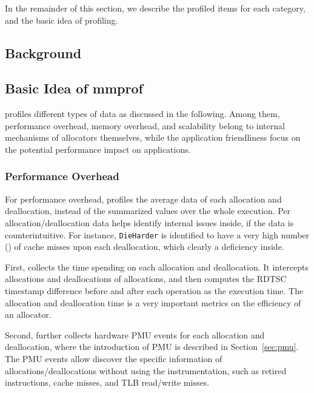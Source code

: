 In the remainder of this section, we describe the profiled items for each category, and the basic idea of profiling. 

\subsection{Background}

 

\subsection{Basic Idea of mmprof}
\MP{} profiles different types of data as discussed in the following. Among them,  performance overhead, memory overhead, and scalability belong to internal mechanisms of allocators themselves, while the application friendliness focus on the potential performance impact on applications.  
  
\subsubsection{Performance Overhead}

For performance overhead, \MP{} profiles the average data of each allocation and deallocation, instead of the summarized values over the whole execution. Per allocation/deallocation data helps identify internal issues inside, if the data is counterintuitive. For instance, \texttt{DieHarder} is identified to have a very high number () of cache misses upon each deallocation, which clearly a deficiency inside. 

First, \MP{} collects the time spending on each allocation and deallocation. It intercepts allocations and deallocations of allocations, and then computes the RDTSC timestamp difference before and after each operation as the execution time. The allocation and deallocation time is a very important metrics on the efficiency of an allocator.  

% 

Second, \MP{} further collects hardware PMU events for each allocation and deallocation, where the introduction of PMU is described in Section~\ref{sec:pmu}. The PMU events allow \MP{} discover the specific information of allocations/deallocations without using the instrumentation, such as retired instructions, cache misses, and TLB read/write misses. 

